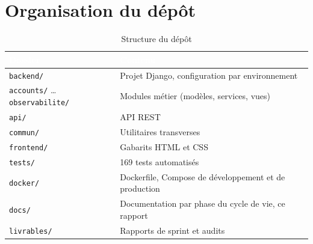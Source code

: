 \documentclass[11pt,a4paper]{report}
\newcommand{\entete}{\rowcolor{primaire}}
\newcommand{\tete}[1]{\textcolor{white}{\textbf{#1}}}
\newcommand{\code}[1]{\texttt{\small #1}}
\begin{document}
\section{Organisation du dépôt}

\begin{table}[H]
\centering
\caption{Structure du dépôt}
\begin{tabularx}{\linewidth}{@{}p{5.7cm}Y@{}}
\toprule
\entete \tete{Dossier} & \tete{Contenu} \\
\midrule
\code{backend/} & Projet Django, configuration par environnement \\
\code{accounts/} \dots{} \code{observabilite/} & Modules métier (modèles, services, vues) \\
\code{api/} & API REST \\
\code{commun/} & Utilitaires transverses \\
\code{frontend/} & Gabarits HTML et CSS \\
\code{tests/} & 169 tests automatisés \\
\code{docker/} & Dockerfile, Compose de développement et de production \\
\code{docs/} & Documentation par phase du cycle de vie, ce rapport \\
\code{livrables/} & Rapports de sprint et audits \\
\bottomrule
\end{tabularx}
\end{table}
\end{document}
